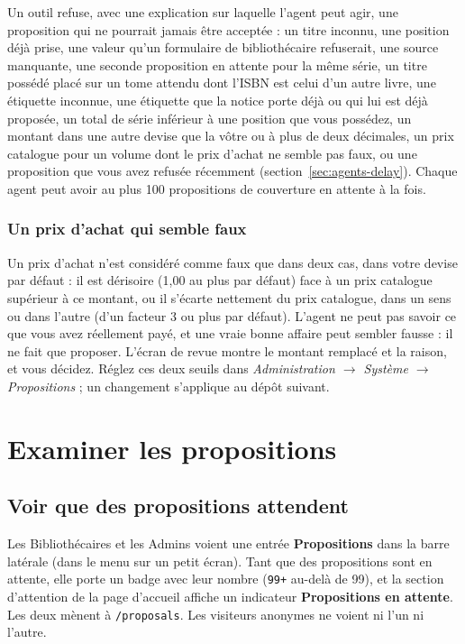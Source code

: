 Un outil refuse, avec une explication sur laquelle l'agent peut agir,
une proposition qui ne pourrait jamais être acceptée : un titre
inconnu, une position déjà prise, une valeur qu'un formulaire de
bibliothécaire refuserait, une source manquante, une seconde
proposition en attente pour la même série, un titre possédé placé sur
un tome attendu dont l'ISBN est celui d'un autre livre, une étiquette
inconnue, une étiquette que la notice porte déjà ou qui lui est déjà
proposée, un total de série inférieur à une position que vous
possédez, un montant dans une autre devise que la vôtre ou à plus de
deux décimales, un prix catalogue pour un volume dont le prix d'achat
ne semble pas faux, ou une proposition que vous avez refusée récemment
(section~\ref{sec:agents-delay}). Chaque
agent peut avoir au plus 100 propositions de couverture en attente à
la fois.

\subsubsection*{Un prix d'achat qui semble faux}

Un prix d'achat n'est considéré comme faux que dans deux cas, dans votre
devise par défaut : il est dérisoire (1,00 au plus par défaut) face à un
prix catalogue supérieur à ce montant, ou il s'écarte nettement du prix catalogue,
dans un sens ou dans l'autre (d'un facteur 3 ou plus par défaut).
L'agent ne peut pas savoir ce que vous avez réellement payé, et une
vraie bonne affaire peut sembler fausse : il ne fait que proposer.
L'écran de revue montre le montant remplacé et la raison, et vous
décidez. Réglez ces deux seuils dans \emph{Administration
\(\rightarrow\) Système \(\rightarrow\) Propositions} ; un changement
s'applique au dépôt suivant.

\section{Examiner les propositions}
\label{sec:proposals}

\subsection{Voir que des propositions attendent}

Les Bibliothécaires et les Admins voient une entrée
\textbf{Propositions} dans la barre
latérale (dans le menu sur un petit écran). Tant que des propositions sont en attente, elle porte un
badge avec leur nombre (\texttt{99+} au-delà de 99), et la section
d'attention de la page d'accueil affiche un indicateur
\textbf{Propositions en attente}. Les deux mènent à
\texttt{/proposals}. Les visiteurs anonymes ne voient ni l'un ni
l'autre.

